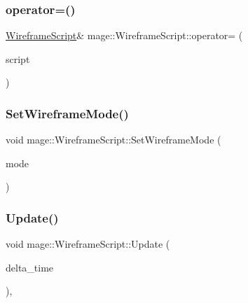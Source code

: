 \hypertarget{classmage_1_1_wireframe_script_a6be79bd5b62f7cf6e9d1237dba0a5bdc}{}\label{classmage_1_1_wireframe_script_a6be79bd5b62f7cf6e9d1237dba0a5bdc} 
\subsubsection{\texorpdfstring{operator=()}{operator=()}\hspace{0.1cm}{\footnotesize\ttfamily [2/2]}}
{\footnotesize\ttfamily \hyperlink{classmage_1_1_wireframe_script}{Wireframe\+Script}\& mage\+::\+Wireframe\+Script\+::operator= (\begin{DoxyParamCaption}\item[{\hyperlink{classmage_1_1_wireframe_script}{Wireframe\+Script} \&\&}]{script }\end{DoxyParamCaption})\hspace{0.3cm}{\ttfamily [delete]}}

\hypertarget{classmage_1_1_wireframe_script_a6af1f089855ac68fd0a7e8d3e46560f1}{}\label{classmage_1_1_wireframe_script_a6af1f089855ac68fd0a7e8d3e46560f1} 
\subsubsection{\texorpdfstring{Set\+Wireframe\+Mode()}{SetWireframeMode()}}
{\footnotesize\ttfamily void mage\+::\+Wireframe\+Script\+::\+Set\+Wireframe\+Mode (\begin{DoxyParamCaption}\item[{\hyperlink{classmage_1_1_wireframe_script_a99d65e77e89c2581544e68030adcefb7}{Wireframe\+Mode}}]{mode }\end{DoxyParamCaption})\hspace{0.3cm}{\ttfamily [noexcept]}}

\hypertarget{classmage_1_1_wireframe_script_af077736607ad22f66d8553066af51760}{}\label{classmage_1_1_wireframe_script_af077736607ad22f66d8553066af51760} 
\subsubsection{\texorpdfstring{Update()}{Update()}}
{\footnotesize\ttfamily void mage\+::\+Wireframe\+Script\+::\+Update (\begin{DoxyParamCaption}\item[{double}]{delta\+\_\+time }\end{DoxyParamCaption})\hspace{0.3cm}{\ttfamily [override]}, {\ttfamily [virtual]}}

